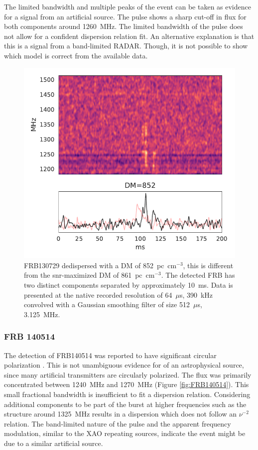 \documentclass[a4paper,fleqn,usenatbib]{mnras}
\begin{document}
The limited bandwidth and multiple peaks of the event can be taken as evidence
for a signal from an artificial source. The pulse shows a sharp cut-off in flux
for both components around 1260~MHz. The limited bandwidth of the pulse does not
allow for a confident dispersion relation fit. An alternative explanation is
that this is a signal from a band-limited RADAR. Though, it is not possible to
show which model is correct from the available data.

\begin{figure}
    \includegraphics[width=1.0\linewidth]{figures/FRB130729.pdf}
    \caption{FRB130729 dedispersed with a DM of 852~pc~cm$^{-3}$, this is
    different from the \gls{snr}-maximized DM of 861~pc~cm$^{-3}$.  The detected
    FRB has two distinct components separated by approximately 10~ms. Data is
    presented at the native recorded resolution of 64~$\mu$s, 390~kHz convolved
    with a Gaussian smoothing filter of size 512~$\mu$s, 3.125~MHz.}
    \label{fig:FRB130729}
\end{figure}

\subsubsection{FRB 140514}

The detection of FRB140514 was reported to have significant circular
polarization \citep{2015MNRAS.447..246P}.  This is not unambiguous evidence for
of an astrophysical source, since many artificial transmitters are circularly
polarized.  The flux was primarily concentrated between 1240~MHz and 1270~MHz
(Figure \ref{fig:FRB140514}). This small fractional bandwidth is insufficient to
fit a dispersion relation. Considering additional components to be part of the
burst at higher frequencies such as the structure around 1325~MHz results in a
dispersion which does not follow an $\nu^{-2}$ relation. The band-limited nature
of the pulse and the apparent frequency modulation, similar to the XAO repeating
sources, indicate the event might be due to a similar artificial source. 
\end{document}
